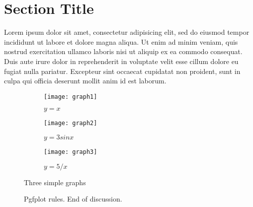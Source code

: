 
    \section{Section Title}
        Lorem ipsum dolor sit amet, consectetur adipisicing elit, sed do eiusmod tempor incididunt ut labore et dolore magna aliqua. Ut enim ad minim veniam, quis nostrud exercitation ullamco laboris nisi ut aliquip ex ea commodo consequat. Duis aute irure dolor in reprehenderit in voluptate velit esse cillum dolore eu fugiat nulla pariatur. Excepteur sint occaecat cupidatat non proident, sunt in culpa qui officia deserunt mollit anim id est laborum.

        \begin{figure}
            \centering
            \begin{subfigure}[b]{0.3\textwidth}
                \centering
                \texttt{[image: graph1]}
                \caption{$y=x$}
                \label{fig:y equals x}
            \end{subfigure}
            \hfill
            \begin{subfigure}[b]{0.3\textwidth}
                \centering
                \texttt{[image: graph2]}
                \caption{$y=3sinx$}
                \label{fig:three sin x}
            \end{subfigure}
            \hfill
            \begin{subfigure}[b]{0.3\textwidth}
                \centering
                \texttt{[image: graph3]}
                \caption{$y=5/x$}
                \label{fig:five over x}
            \end{subfigure}
            \caption{Three simple graphs}
            \label{fig:three graphs}
        \end{figure}


        \begin{figure}[ht!]
            \centering
            \caption{Pgfplot rules. End of discussion.}
            \label{fig:pgfplotExample}
        \end{figure}

